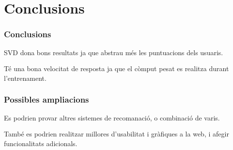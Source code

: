 \documentclass[catalan]{beamer}
\begin{document}
\section{Conclusions}

\begin{frame}
\frametitle{Conclusions}

SVD dona bons resultats ja que abstrau més les puntuacions dels usuaris.

Té una bona velocitat de resposta ja que el còmput pesat es realitza durant l'entrenament.
\end{frame}

\begin{frame}
\frametitle{Possibles ampliacions}

Es podrien provar altres sistemes de recomanació, o combinació de varis.

També es podrien realitzar millores d'usabilitat i gràfiques a la web, i afegir funcionalitats adicionals.

\end{frame}

\frame{\titlepage}
\end{document}
